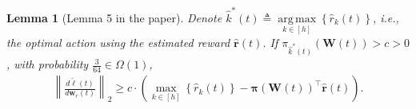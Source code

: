 \documentclass[10pt]{article}
\def\rvr{{\mathbf{r}}}
\def\rvw{{\mathbf{w}}}
\newtheorem{lem}{Lemma}
\def\rvpi{{\boldsymbol{\pi}}}
\def\rmW{{\mathbf{W}}}
\DeclareMathOperator*{\argmax}{arg\,max}
\begin{document}
\begin{lem}[Lemma 5 in the paper]
\label{lem:gradient_lower_bound}
	Denote $\hat{k}^*(t) \triangleq \argmax\limits_{k \in [h]}\left\{ \hat{r}_{k}\left(t\right) \right\}$, i.e., the optimal action using the estimated reward $ \hat{\rvr}\left(t\right)$. If $\pi_{\hat{k}^*(t)}\left(\rmW(t)\right) > c > 0$, with probability $\frac{3}{64} \in \Omega\left( 1 \right)$,
\begin{equation*}
\begin{split}
	\left\| \frac{d\tilde{\ell}\left(t\right)}{d \rvw_r(t)} \right\|_2 \ge c \cdot \left( \max\limits_{k \in \left[h\right]}\left\{ \hat{r}_k\left(t\right) \right\} - \rvpi\left( \rmW(t) \right)^\top \hat{\rvr}\left(t\right) \right) .
\end{split}
\end{equation*}
\end{lem}
\end{document}
